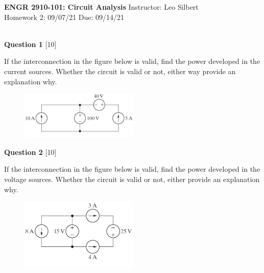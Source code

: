 \documentclass[12pt]{article}
\begin{document}

\begin{center}
\hfil
{\large\bf {ENGR 2910-101: Circuit Analysis}}
\hfill Instructor: Leo Silbert \\
Homework 2: 09/07/21 \hfill Due: 09/14/21\\
\hrulefill\\
\end{center}




\noindent
{\bf Question 1} [10] %

If the interconnection in the figure below is valid, find the power developed in the current sources. Whether the circuit is valid or not, either way provide an explanation why.
\begin{figure}[h!]
  \centering 
  \includegraphics[clip,width=0.5\textwidth]{P2-1.png}
\end{figure}

\vspace{0.1in}
\noindent
{\bf Question 2} [10] %

If the interconnection in the figure below is valid, find the power developed in the voltage sources. Whether the circuit is valid or not, either provide an explanation why.
\begin{figure}[h!]
  \centering 
  \includegraphics[clip,width=0.5\textwidth]{P2-3.png}
\end{figure}
\end{document}
